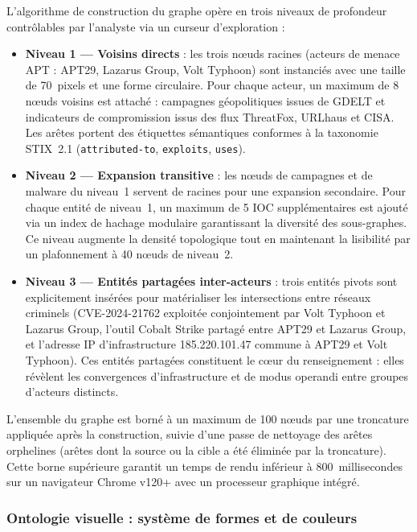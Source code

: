 L'algorithme de construction du graphe opère en trois niveaux de profondeur contrôlables par l'analyste via un curseur d'exploration :

\begin{itemize}
    \item \textbf{Niveau 1 --- Voisins directs} : les trois nœuds racines (acteurs de menace APT : APT29, Lazarus Group, Volt Typhoon) sont instanciés avec une taille de 70~pixels et une forme circulaire. Pour chaque acteur, un maximum de 8 nœuds voisins est attaché : campagnes géopolitiques issues de GDELT et indicateurs de compromission issus des flux ThreatFox, URLhaus et CISA. Les arêtes portent des étiquettes sémantiques conformes à la taxonomie STIX~2.1 (\texttt{attributed-to}, \texttt{exploits}, \texttt{uses}).
    \item \textbf{Niveau 2 --- Expansion transitive} : les nœuds de campagnes et de malware du niveau~1 servent de racines pour une expansion secondaire. Pour chaque entité de niveau~1, un maximum de 5 IOC supplémentaires est ajouté via un index de hachage modulaire garantissant la diversité des sous-graphes. Ce niveau augmente la densité topologique tout en maintenant la lisibilité par un plafonnement à 40 nœuds de niveau~2.
    \item \textbf{Niveau 3 --- Entités partagées inter-acteurs} : trois entités pivots sont explicitement insérées pour matérialiser les intersections entre réseaux criminels (CVE-2024-21762 exploitée conjointement par Volt Typhoon et Lazarus Group, l'outil Cobalt Strike partagé entre APT29 et Lazarus Group, et l'adresse IP d'infrastructure 185.220.101.47 commune à APT29 et Volt Typhoon). Ces entités partagées constituent le cœur du renseignement : elles révèlent les convergences d'infrastructure et de modus operandi entre groupes d'acteurs distincts.
\end{itemize}

L'ensemble du graphe est borné à un maximum de 100 nœuds par une troncature appliquée après la construction, suivie d'une passe de nettoyage des arêtes orphelines (arêtes dont la source ou la cible a été éliminée par la troncature). Cette borne supérieure garantit un temps de rendu inférieur à 800~millisecondes sur un navigateur Chrome v120+ avec un processeur graphique intégré.

\subsubsection{Ontologie visuelle : système de formes et de couleurs}

